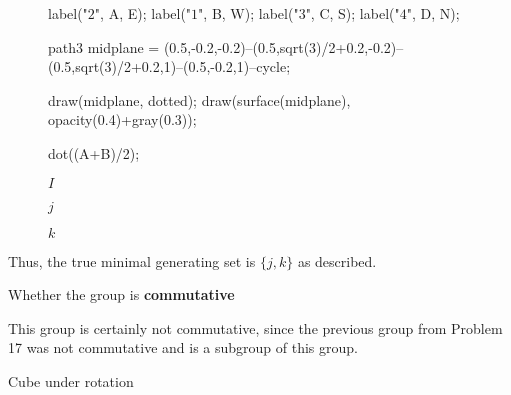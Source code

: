 \documentclass[../gatm_answers.tex]{subfiles}
\begin{document}
\begin{figure}[h]
\begin{center}
\begin{minipage}{0.3\textwidth}
\begin{asy}[width=0.9\textwidth]
			label("$2$", A, E);
			label("$1$", B, W);
			label("$3$", C, S);
			label("$4$", D, N);
			
			path3 midplane = (0.5,-0.2,-0.2)--(0.5,sqrt(3)/2+0.2,-0.2)--(0.5,sqrt(3)/2+0.2,1)--(0.5,-0.2,1)--cycle;
			
			draw(midplane, dotted);
			draw(surface(midplane), opacity(0.4)+gray(0.3));
			
			dot((A+B)/2);
			\end{asy}
		\end{minipage}
	\end{center}
	\vspace*{-2\baselineskip}
	\begin{center}
		\begin{minipage}[t]{0.3\textwidth}
			\centering
			$I$
		\end{minipage}
		\hfill
		\begin{minipage}[t]{0.3\textwidth}
			\centering
			$j$
		\end{minipage}
		\hfill
		\begin{minipage}[t]{0.3\textwidth}
			\centering
			$k$
		\end{minipage}
	\end{center}
	\vspace*{-2\baselineskip}
	\begin{center}
		\begin{minipage}[t]{\textwidth}
		\end{minipage}
	\end{center}
	\vspace*{-2\baselineskip}
\end{figure}

\noindent Thus, the true minimal generating set is $\{j,k\}$ as described.

\begin{inner_problem}
\item Whether the group is \textbf{commutative}
\end{inner_problem}

\noindent This group is certainly not commutative, since the previous group from Problem 17 was not commutative and is a subgroup of this group.

\begin{outer_problem}
\item Cube under rotation
\end{outer_problem}
\end{document}
